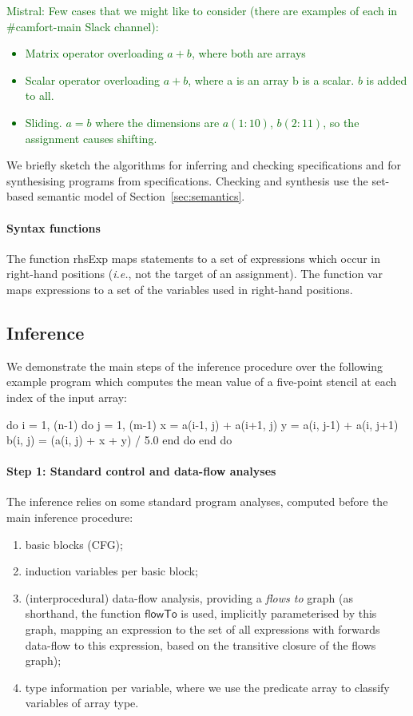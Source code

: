 \documentclass[9pt]{sigplanconf}
\newcommand{\mnote}[1]{\textcolor{darkgreen}{Mistral: #1}}
\newcounter{block}
\theoremstyle{definition}
\newcommand{\ie}{\emph{i.e.}}
\newcommand{\arrayTy}{\textsf{array}}
\newcommand{\rhsExp}{\textsf{rhsExp}}
\newcommand{\var}{\textsf{var}}
\begin{document}
\mnote{Few cases that we might like to consider (there are examples
    of each in \#camfort-main Slack channel):
  \begin{itemize}
    \item Matrix operator overloading $a + b$, where both are arrays
    \item Scalar operator overloading $a + b$, where a is an array b is a
      scalar. $b$ is added to all.
    \item Sliding. $a = b$ where the dimensions are $a(1:10)$, $b(2:11)$,
      so the assignment causes shifting.
  \end{itemize}
}

\noindent
We briefly sketch the algorithms for inferring and checking
specifications and for synthesising programs from specifications.
Checking and synthesis use the set-based semantic model of
Section~\ref{sec:semantics}.

\paragraph{Syntax functions}
The function \rhsExp{} maps statements to a
set of expressions which occur in right-hand positions (\ie{}, not the
target of an assignment). The function \var{} maps expressions to a
set of the variables used in right-hand positions.

\subsection{Inference\label{sec:inference}}

We demonstrate the main steps of the inference procedure over the
following example program which computes the mean value
of a five-point stencil at each index of the input array:
\begin{ExmVerbatim}
do i = 1, (n-1)
   do j = 1, (m-1)
      x       = a(i-1, j) + a(i+1, j)
      y       = a(i, j-1) + a(i, j+1)
      b(i, j) = (a(i, j) + x + y) / 5.0
   end do
end do
\end{ExmVerbatim}
\paragraph{Step 1: Standard control and data-flow analyses}
The inference relies on some standard program analyses, computed
before the main inference procedure:
%
\begin{enumerate}
\item basic blocks (CFG);
\item induction variables per basic block;
\item (interprocedural) data-flow analysis, providing a \emph{flows to}
  graph (as shorthand, the function
  $\mathsf{flowTo}$ is used, implicitly parameterised by this graph,
  mapping an expression to the set of all expressions
  with forwards data-flow to this expression, based on the transitive
  closure of the flows graph);
\item type information per variable, where we use the predicate
\arrayTy{} to classify variables of array type.
\end{enumerate}
%
\end{document}
